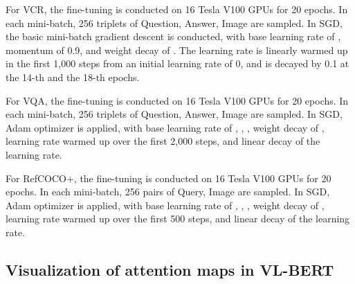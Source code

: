 \documentclass{article} \usepackage{iclr2020_conference,times}
\begin{document}
For VCR, the fine-tuning is conducted on 16 Tesla V100 GPUs for 20 epochs. In each mini-batch, 256 triplets of Question, Answer, Image are sampled. In SGD, the basic mini-batch gradient descent is conducted, with base learning rate of , momentum of 0.9, and weight decay of . The learning rate is linearly warmed up in the first 1,000 steps from an initial learning rate of 0, and is decayed by 0.1 at the 14-th and the 18-th epochs.

For VQA, the fine-tuning is conducted on 16 Tesla V100 GPUs for 20 epochs. In each mini-batch, 256 triplets of Question, Answer, Image are sampled. In SGD, Adam optimizer is applied, with base learning rate of , , , weight decay of , learning rate warmed up over the first 2,000 steps, and linear decay of the learning rate.

For RefCOCO+, the fine-tuning is conducted on 16 Tesla V100 GPUs for 20 epochs. In each mini-batch, 256 pairs of Query, Image are sampled. In SGD, Adam optimizer is applied, with base learning rate of , , , weight decay of , learning rate warmed up over the first 500 steps, and linear decay of the learning rate.

\subsection{Visualization of attention maps in VL-BERT}
\end{document}
